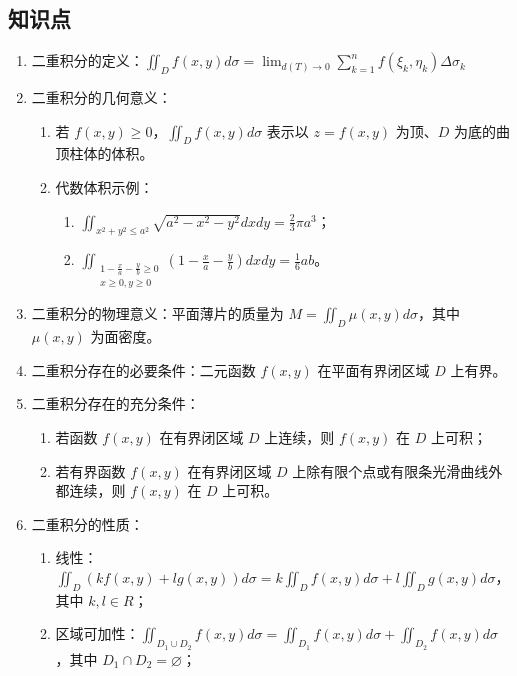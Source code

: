 \documentclass[UTF8]{ctexart}
\theoremstyle{remark}
\begin{document}
	\subsection*{知识点}
		\begin{enumerate}
			\item 二重积分的定义：\(\iint_{D} f(x, y) d \sigma=\lim _{d(T) \to 0} \sum_{k=1}^{n} f(\xi_{k}, \eta_{k}) \Delta \sigma_{k}\)
			\item 二重积分的几何意义：
			\begin{enumerate}
				\item 若 \(f(x, y) \geq 0\)，\(\iint_{D} f(x, y) d \sigma\) 表示以 \(z=f(x, y)\) 为顶、\(D\) 为底的曲顶柱体的体积。
				\item 代数体积示例：
				\begin{enumerate}
					\item \(\iint_{x^{2}+y^{2} \leq a^{2}} \sqrt{a^{2}-x^{2}-y^{2}} d x d y=\frac{2}{3} \pi a^{3}\)；
					\item \(\iint_{\substack{1-\frac{x}{a}-\frac{y}{b} \geq 0 \\ x \geq 0, y \geq 0}} \left(1-\frac{x}{a}-\frac{y}{b}\right) d x d y=\frac{1}{6} a b\)。
				\end{enumerate}
			\end{enumerate}
			\item 二重积分的物理意义：平面薄片的质量为 \(M=\iint_{D} \mu(x, y) d \sigma\)，其中 \(\mu(x, y)\) 为面密度。
			\item 二重积分存在的必要条件：二元函数 \(f(x, y)\) 在平面有界闭区域 \(D\) 上有界。
			\item 二重积分存在的充分条件：
			\begin{enumerate}
				\item 若函数 \(f(x, y)\) 在有界闭区域 \(D\) 上连续，则 \(f(x, y)\) 在 \(D\) 上可积；
				\item 若有界函数 \(f(x, y)\) 在有界闭区域 \(D\) 上除有限个点或有限条光滑曲线外都连续，则 \(f(x, y)\) 在 \(D\) 上可积。
			\end{enumerate}
			\item 二重积分的性质：
			\begin{enumerate}
				\item 线性：\(\iint_{D}(k f(x, y)+l g(x, y)) d \sigma=k \iint_{D} f(x, y) d \sigma+l \iint_{D} g(x, y) d \sigma\)，其中 \(k, l \in R\)；
				\item 区域可加性：\(\iint_{D_{1} \cup D_{2}} f(x, y) d \sigma=\iint_{D_{1}} f(x, y) d \sigma+\iint_{D_{2}} f(x, y) d \sigma\)，其中 \(D_{1} \cap D_{2}=\varnothing\)；

\end{enumerate}
\end{enumerate}
\end{document}
